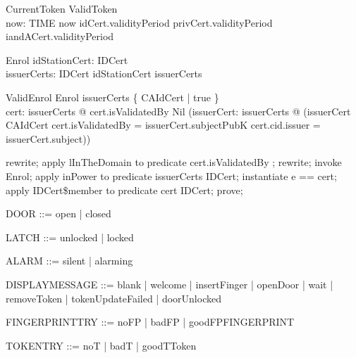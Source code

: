 \begin{schema}{CurrentToken}
  ValidToken\\
  now: TIME
\where
  now \in  idCert.validityPeriod \cap  privCert.validityPeriod \cap  iandACert.validityPeriod
\end{schema}

\begin{schema}{Enrol}
  idStationCert: IDCert\\
  issuerCerts: \power  IDCert
\where
  idStationCert \in  issuerCerts
\end{schema}

\begin{schema}{ValidEnrol}
  Enrol
\where
  issuerCerts \cap  \{  CAIdCert | true \} \neq  \emptyset\\
  \forall  cert: issuerCerts @ cert.isValidatedBy \neq  Nil \land  (\exists  issuerCert: issuerCerts @ (issuerCert \in  CAIdCert \land  \The cert.isValidatedBy = issuerCert.subjectPubK \land  cert.cid.issuer = issuerCert.subject))
\end{schema}

\begin{zproof}
rewrite;
apply lInTheDomain to predicate cert.isValidatedBy \in  \dom  \The;
rewrite;
invoke Enrol;
apply inPower to predicate issuerCerts \in  \power  IDCert;
instantiate e == cert;
apply IDCert\$member to predicate cert \in  IDCert;
prove;
\end{zproof}

\begin{zed}
DOOR ::= open | closed
\end{zed}

\begin{zed}
LATCH ::= unlocked | locked
\end{zed}

\begin{zed}
ALARM ::= silent | alarming
\end{zed}

\begin{zed}
DISPLAYMESSAGE ::= blank | welcome | insertFinger | openDoor | wait | removeToken | tokenUpdateFailed | doorUnlocked
\end{zed}

\begin{zed}
FINGERPRINTTRY ::= noFP | badFP | goodFP\ldata FINGERPRINT\rdata
\end{zed}

\begin{zed}
TOKENTRY ::= noT | badT | goodT\ldata Token\rdata
\end{zed}

